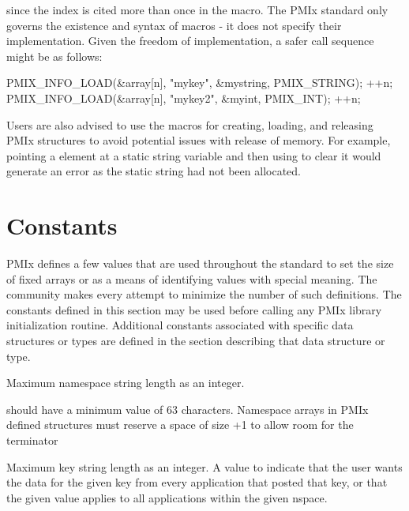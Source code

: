 since the index is cited more than once in the macro. The \ac{PMIx} standard only governs the existence and syntax of macros - it does not specify their implementation. Given the freedom of implementation, a safer call sequence might be as follows:

\begin{codepar}
PMIX_INFO_LOAD(&array[n], "mykey", &mystring, PMIX_STRING);
++n;
PMIX_INFO_LOAD(&array[n], "mykey2", &myint, PMIX_INT);
++n;
\end{codepar}

Users are also advised to use the macros for creating, loading, and releasing
\ac{PMIx} structures to avoid potential issues with release of memory. For
example, pointing a  element at a static string
variable and then using  to clear it would
generate an error as the static string had not been allocated.

\adviceuserend

\section{Constants}

\ac{PMIx} defines a few values that are used throughout the standard to set the size of fixed arrays or as a means of identifying values with special meaning.
The community makes every attempt to minimize the number of such definitions.
The constants defined in this section may be used before calling any \ac{PMIx} library initialization routine.
Additional constants associated with specific data structures or types are defined in the section describing that data structure or type.

\begin{constantdesc}
%
Maximum namespace string length as an integer.
\end{constantdesc}

\adviceimplstart
{} should have a minimum value of 63 characters. Namespace arrays in \ac{PMIx} defined structures must reserve
a space of size +1 to allow room for the  terminator
\adviceimplend

\begin{constantdesc}
%
Maximum key string length as an integer.
%
A value to indicate that the user wants the data for the given key from every application that posted that key, or that the given value applies to all applications within the given nspace.

\end{constantdesc}

